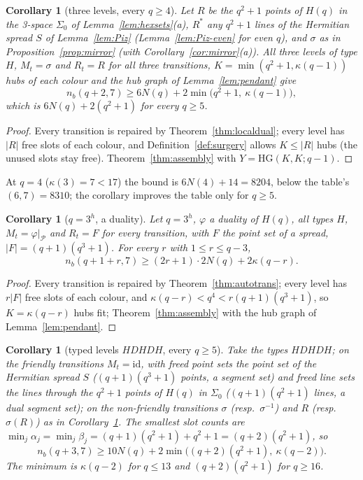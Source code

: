 \documentclass[11pt]{amsart}
\newtheorem{corollary}[theorem]{Corollary}
\theoremstyle{definition}
\theoremstyle{remark}
\numberwithin{equation}{section}
\newcommand{\nb}{n_b}
\newcommand{\cP}{\mathcal P}
\begin{document}
\begin{corollary}[three levels, every $q\ge4$]\label{cor:d7-91}
Let $R$ be the $q^2+1$ points of $H(q)$ in the 3-space $\Sigma_0$ of Lemma~\ref{lem:hexsets}(a), $R^*$ any $q^2+1$ lines of
the Hermitian spread $S$ of Lemma~\ref{lem:Piz} (Lemma~\ref{lem:Piz-even} for even $q$), and $\sigma$ as in Proposition~\ref{prop:mirror} (with Corollary~\ref{cor:mirror}(a)). All three
levels of type $H$, $M_t=\sigma$ and $R_t=R$ for all three transitions, $K=\min(q^2+1,\kappa(q-1))$ hubs of each colour and
the hub graph of Lemma~\ref{lem:pendant} give
\[
\nb(q+2,7)\ge6N(q)+2\min\bigl(q^2+1,\ \kappa(q-1)\bigr),
\]
which is $6N(q)+2(q^2+1)$ for every $q\ge5$.
\end{corollary}

\begin{proof}
Every transition is repaired by Theorem~\ref{thm:localdual}; every level has $|R|$ free slots of each colour, and
Definition~\ref{def:surgery} allows $K\le|R|$ hubs (the unused slots stay free). Theorem~\ref{thm:assembly} with
$Y=\mathrm{HG}(K,K;q-1)$.
\end{proof}

At $q=4$ ($\kappa(3)=7<17$) the bound is $6N(4)+14=8204$, below the table's $(6,7)=8310$; the corollary improves the table
only for $q\ge5$.

\begin{corollary}[$q=3^h$, a duality]\label{cor:d7-92}
Let $q=3^h$, $\varphi$ a duality of $H(q)$, all types $H$, $M_t=\varphi|_\cP$ and $R_t=F$ for every transition, with $F$ the
point set of a spread, $|F|=(q+1)(q^3+1)$. For every $r$ with $1\le r\le q-3$,
\[
\nb(q+1+r,7)\ge(2r+1)\cdot2N(q)+2\kappa(q-r).
\]
\end{corollary}

\begin{proof}
Every transition is repaired by Theorem~\ref{thm:autotrans}; every level has $r|F|$ free slots of each colour, and
$\kappa(q-r)<q^4<r(q+1)(q^3+1)$, so $K=\kappa(q-r)$ hubs fit; Theorem~\ref{thm:assembly} with the hub graph of
Lemma~\ref{lem:pendant}.
\end{proof}

\begin{corollary}[typed levels $HDHDH$, every $q\ge5$]\label{cor:d7-93}
Take the types $HDHDH$; on the friendly transitions $M_t=\mathrm{id}$, with freed point sets the point set of the Hermitian
spread $S$ ($(q+1)(q^3+1)$ points, a segment set) and freed line sets the lines through the $q^2+1$ points of $H(q)$ in
$\Sigma_0$ ($(q+1)(q^2+1)$ lines, a dual segment set); on the non-friendly transitions $\sigma$ (resp.\ $\sigma^{-1}$) and
$R$ (resp.\ $\sigma(R)$) as in Corollary~\ref{cor:d7-91}. The smallest slot counts are
$\min_j\alpha_j=\min_j\beta_j=(q+1)(q^2+1)+q^2+1=(q+2)(q^2+1)$, so
\[
\nb(q+3,7)\ge10N(q)+2\min\bigl((q+2)(q^2+1),\ \kappa(q-2)\bigr).
\]
The minimum is $\kappa(q-2)$ for $q\le13$ and $(q+2)(q^2+1)$ for $q\ge16$.
\end{corollary}
\end{document}
